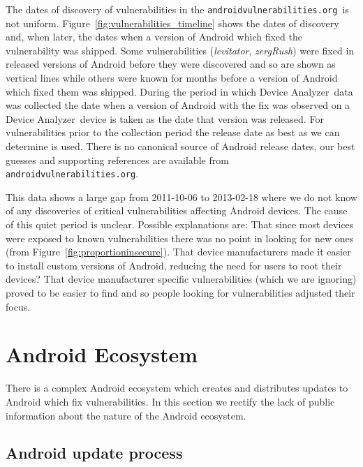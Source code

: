 \documentclass[conference,a4paper,twoside]{IEEEtran}
\newcommand{\da}{Device Analyzer}
\newcommand{\avo}{\texttt{androidvulnerabilities.org}}
\begin{document}
The dates of discovery of vulnerabilities in the \avo\ is not uniform.
Figure~\ref{fig:vulnerabilities_timeline} shows the dates of discovery and, when later, the dates when a version of Android which fixed the vulnerability was shipped.
Some vulnerabilities (\emph{levitator}, \emph{zergRush}) were fixed in released versions of Android before they were discovered and so are shown as vertical lines while others were known for months before a version of Android which fixed them was shipped.
During the period in which \da\ data was collected the date when a version of Android with the fix was observed on a \da\ device is taken as the date that version was released.
For vulnerabilities prior to the collection period the release date as best as we can determine is used.
There is no canonical source of Android release dates, our best guesses and supporting references are available from \avo.

This data shows a large gap from 2011-10-06 to 2013-02-18 where we do not know of any discoveries of critical vulnerabilities affecting Android devices.
The cause of this quiet period is unclear.
Possible explanations are: That since most devices were exposed to known vulnerabilities there was no point in looking for new ones (from Figure~\ref{fig:proportioninsecure}).
That device manufacturers made it easier to install custom versions of Android, reducing the need for users to root their devices?
That device manufacturer specific vulnerabilities (which we are ignoring) proved to be easier to find and so people looking for vulnerabilities adjusted their focus.

\section{Android Ecosystem}\label{sec:android_ecosystem}
There is a complex Android ecosystem which creates and distributes updates to Android which fix vulnerabilities.
In this section we rectify the lack of public information about the nature of the Android ecosystem.


\subsection{Android update process}
\end{document}
